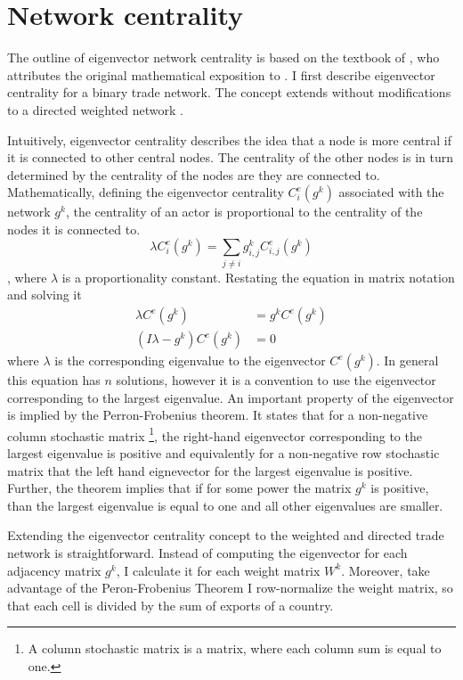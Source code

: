  \section{Network centrality}
The outline of eigenvector network centrality is based on the textbook of \textcite{jackson2010}, who attributes the original mathematical exposition to \textcite{Bonacich77}.
I first describe eigenvector centrality for a binary trade network.
The concept extends without modifications to a directed weighted network  \parencite{jackson2010}.  \par
Intuitively, eigenvector centrality describes the idea that a node is more central if it is connected to other central nodes.
The centrality of the other nodes is in turn determined by the centrality of the nodes are they are connected to.
Mathematically, defining the eigenvector centrality $C^e_i (g^k)$ associated with the network $g^k$, the centrality of an actor is proportional to the centrality of the nodes it is connected to.
\[  \lambda C^e_i (g^k) = \sum_{j \neq i}  g^k_{i,j}C^e_{i,j}(g^k)  \]
, where $\lambda$ is a proportionality constant.
Restating the equation in matrix notation and solving it
\begin{align*}
 \lambda C^e (g^k) & =  g^k C^e (g^k) \\
( I  \lambda-g^k) C^e(g^k) & = 0
 \end{align*}
where $ \lambda$ is the corresponding eigenvalue to the eigenvector $C^e(g^k)$.
In general this equation has $n$ solutions, however it is a convention to use the eigenvector corresponding to the largest eigenvalue.
An important property of the eigenvector is implied by the Perron-Frobenius theorem.
It states that for a non-negative column stochastic matrix
 \footnote{A column stochastic matrix is a matrix, where each column sum is equal to one.}, the right-hand eigenvector corresponding to the largest eigenvalue is positive
 and equivalently for a non-negative row stochastic matrix that the left hand  eignevector for the largest eigenvalue is positive.
Further, the theorem implies that if for some power the matrix $g^k$ is positive, than the largest eigenvalue is equal to one and all other eigenvalues are smaller.
 \par
Extending the eigenvector centrality concept to the weighted and directed trade network is straightforward.
Instead of computing the eigenvector for each adjacency matrix $g^k$, I calculate it for each weight matrix $W^k$.
Moreover, take advantage of the Peron-Frobenius Theorem I row-normalize the weight matrix, so that each cell is divided by the sum of exports of a country.
